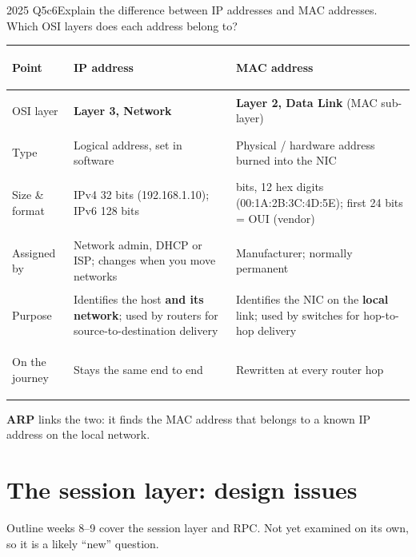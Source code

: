 \documentclass[10pt]{article}
\begin{document}
\begin{pastq}{2025 Q5c}{6}Explain the difference between IP addresses and MAC addresses. Which OSI layers does each address belong to?\end{pastq}
\begin{ans}
\small
\begin{tabularx}{\linewidth}{@{}>{\bfseries\raggedright\arraybackslash}p{2.3cm}>{\raggedright\arraybackslash}X>{\raggedright\arraybackslash}X@{}}
\toprule
Point & IP address & MAC address\\\midrule
OSI layer & \textbf{Layer 3, Network} & \textbf{Layer 2, Data Link} (MAC sub-layer)\\
Type & Logical address, set in software & Physical / hardware address burned into the NIC\\
Size \& format & IPv4 32 bits (192.168.1.10); IPv6 128 bits & 48 bits, 12 hex digits (00:1A:2B:3C:4D:5E); first 24 bits = OUI (vendor)\\
Assigned by & Network admin, DHCP or ISP; changes when you move networks & Manufacturer; normally permanent\\
Purpose & Identifies the host \textbf{and its network}; used by routers for source-to-destination delivery & Identifies the NIC on the \textbf{local} link; used by switches for hop-to-hop delivery\\
On the journey & Stays the same end to end & Rewritten at every router hop\\
\bottomrule
\end{tabularx}
\normalsize
\textbf{ARP} links the two: it finds the MAC address that belongs to a known IP address on the local network.
\end{ans}

\section{The session layer: design issues}

Outline weeks 8--9 cover the session layer and RPC. Not yet examined on its own, so it is a likely ``new'' question.
\end{document}
